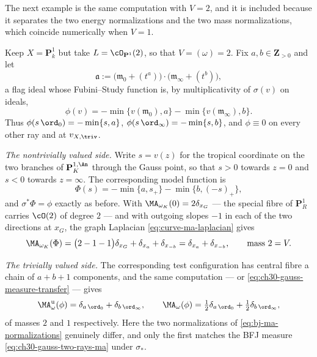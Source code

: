 The next example is the same computation with $V=2$, and it is included
because it separates the two energy normalizations and the two mass
normalizations, which coincide numerically when $V=1$.

\begin{example}
\label{ex:ch30-gauss-two-rays}
Keep $X=\mathbf P^1_k$ but take $L=\cO_{\mathbf P^1}(2)$, so that
$V=(\omega)=2$.  Fix $a,b\in\mathbf Z_{>0}$ and let
\[
 \mathfrak a:=\bigl(\mathfrak m_0+(t^a)\bigr)
              \cdot\bigl(\mathfrak m_\infty+(t^b)\bigr),
\]
a flag ideal whose Fubini--Study function is, by multiplicativity of
$\sigma(v)$ on ideals,
\[
 \phi(v)=-\min\{v(\mathfrak m_0),a\}-\min\{v(\mathfrak m_\infty),b\} .
\]
Thus $\phi(s\,\ord_0)=-\min\{s,a\}$, $\phi(s\,\ord_\infty)=-\min\{s,b\}$,
and $\phi\equiv0$ on every other ray and at $v_{X,\triv}$.

\emph{The nontrivially valued side.}  Write $s=v(z)$ for the tropical
coordinate on the two branches of $\mathbf P^{1,\An}_K$ through the Gauss
point, so that $s>0$ towards $z=0$ and $s<0$ towards $z=\infty$.
The corresponding model function is
\[
 \Phi(s)=-\min\{a,s_+\}-\min\{b,(-s)_+\},
\]
and $\sigma^*\Phi=\phi$ exactly as before.  With
$\MA_{\omega_K}(0)=2\delta_{x_G}$ --- the special fibre of
$\mathbf P^1_R$ carries $\cO(2)$ of degree $2$ --- and with outgoing
slopes $-1$ in each of the two directions at $x_G$, the graph Laplacian
\eqref{eq:curve-ma-laplacian} gives
\begin{equation}
\label{eq:ch30-gauss-two-rays-ma}
 \MA_{\omega_K}(\Phi)
 =\bigl(2-1-1\bigr)\delta_{x_G}+\delta_{x_a}+\delta_{x_{-b}}
 =\delta_{x_a}+\delta_{x_{-b}},
 \qquad\text{mass }2=V .
\end{equation}

\emph{The trivially valued side.}  The corresponding test configuration has
central fibre a chain of $a+b+1$ components, and the same computation ---
or \eqref{eq:ch30-gauss-measure-transfer} --- gives
\begin{equation}
\label{eq:ch30-gauss-two-rays-triv}
 \MA^{\mathrm u}_\omega(\phi)=\delta_{a\,\ord_0}+\delta_{b\,\ord_\infty},
 \qquad
 \MA_\omega(\phi)
 =\tfrac12\delta_{a\,\ord_0}+\tfrac12\delta_{b\,\ord_\infty},
\end{equation}
of masses $2$ and $1$ respectively.  Here the two normalizations of
\eqref{eq:bj-ma-normalizations} genuinely differ, and only the first
matches the BFJ measure \eqref{eq:ch30-gauss-two-rays-ma} under
$\sigma_*$.


\end{example}
